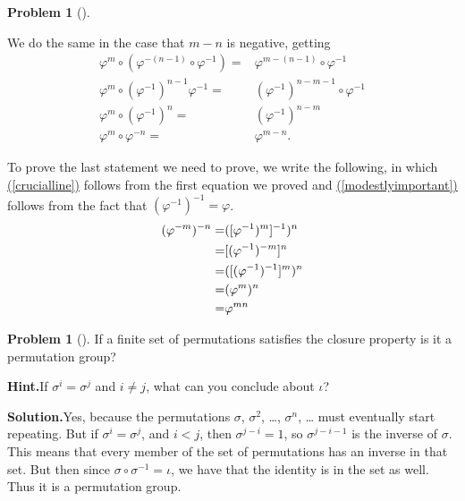\documentclass[10pt,]{book}
\theoremstyle{plain}
\theoremstyle{definition}
\newtheorem{activity}[project]{Problem}
\theoremstyle{definition}
\numberwithin{equation}{chapter}
\newcommand{\lt}{<}
\newcommand{\amp}{&}
\begin{document}
\begin{activity}[]
\begin{enumerate}[font=\bfseries,label=(\alph*),ref=\alph*]
%
\par
We do the same in the case that \(m-n\) is negative, getting%
\begin{align*}
\varphi^m\circ(\varphi^{-(n-1)}\circ\varphi^{-1})  =\amp
\varphi^{m-(n-1)}\circ\varphi^{-1}\\
\varphi^m\circ(\varphi^{-1})^{n-1}\varphi^{-1} =\amp
(\varphi^{-1})^{n-m-1}\circ\varphi^{-1}\\
\varphi^m\circ(\varphi^{-1})^n  =\amp  (\varphi^{-1})^{n-m}\\
\varphi^m\circ\varphi^{-n} =\amp \varphi^{m-n}.
\end{align*}
%
\par
To prove the last statement we need to prove, we write the following, in which \hyperref[crucialline]{(\ref{crucialline})} follows from the first equation we proved and  \hyperref[modestlyimportant]{(\ref{modestlyimportant})} follows from the fact that \((\varphi^{-1})^{-1} = \varphi\).%
\begin{align}
(\varphi^{-m})^{-n}  =\amp  ([\varphi^{-1})^m]^{-1})^n\notag\\
=\amp [(\varphi^{-1})^{-m}]^n\label{crucialline}\\
=\amp ([(\varphi^{-1})^{-1}]^m)^n\notag\\
=\amp (\varphi^m)^n\label{modestlyimportant}\\
=\amp \varphi^{mn}\notag
\end{align}
%
\end{enumerate}
\end{activity}
\begin{activity}[]\label{activity-254}
If a finite set of permutations satisfies the closure property is it a permutation group?%
\par\medskip\noindent%
\textbf{Hint.}\quad If \(\sigma^i = \sigma^j\) and \(i \ne j\), what can you conclude about \(\iota\)?%
\par\medskip\noindent%
\textbf{Solution.}\quad Yes, because the permutations \(\sigma\), \(\sigma^2\), \dots{}, \(\sigma^n\), \dots{} must eventually start repeating. But if \(\sigma^i=\sigma^j\), and \(i\lt j\), then \(\sigma^{j-i} =1\), so \(\sigma^{j-i-1}\) is the inverse of \(\sigma\). This means that every member of the set of permutations has an inverse in that set. But then since \(\sigma\circ\sigma^{-1} = \iota\), we have that the identity is in the set as well. Thus it is a permutation group.%
\end{activity}
\end{document}
